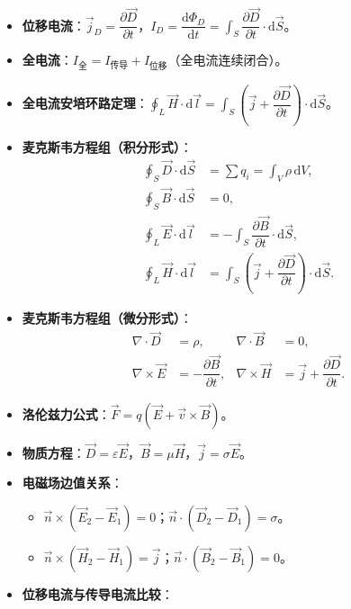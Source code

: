 \documentclass[12pt,a4paper]{ctexart}
\begin{document}
\begin{itemize}
    \item \textbf{位移电流}：$\vec j_D=\dfrac{\partial\vec D}{\partial t}$，$I_D=\dfrac{\mathrm d\Phi_D}{\mathrm dt}=\displaystyle\int_S\dfrac{\partial\vec D}{\partial t}\cdot\mathrm d\vec S$。
    \item \textbf{全电流}：$I_{\text{全}}=I_{\text{传导}}+I_{\text{位移}}$（全电流连续闭合）。
    \item \textbf{全电流安培环路定理}：$\displaystyle\oint_L\vec H\cdot\mathrm d\vec l=\displaystyle\int_S\left(\vec j+\dfrac{\partial\vec D}{\partial t}\right)\cdot\mathrm d\vec S$。
    \item \textbf{麦克斯韦方程组（积分形式）}：
    \begin{align}
        \oint_S\vec D\cdot\mathrm d\vec S &= \sum q_i=\int_V\rho\,\mathrm dV, \\
        \oint_S\vec B\cdot\mathrm d\vec S &= 0, \\
        \oint_L\vec E\cdot\mathrm d\vec l &= -\int_S\dfrac{\partial\vec B}{\partial t}\cdot\mathrm d\vec S, \\
        \oint_L\vec H\cdot\mathrm d\vec l &= \int_S\left(\vec j+\dfrac{\partial\vec D}{\partial t}\right)\cdot\mathrm d\vec S.
    \end{align}
    \item \textbf{麦克斯韦方程组（微分形式）}：
    \begin{align}
        \nabla\cdot\vec D &= \rho, & \nabla\cdot\vec B &= 0, \\
        \nabla\times\vec E &= -\dfrac{\partial\vec B}{\partial t}, & \nabla\times\vec H &= \vec j+\dfrac{\partial\vec D}{\partial t}.
    \end{align}
    \item \textbf{洛伦兹力公式}：$\vec F=q(\vec E+\vec v\times\vec B)$。
    \item \textbf{物质方程}：$\vec D=\varepsilon\vec E$，$\vec B=\mu\vec H$，$\vec j=\sigma\vec E$。
    \item \textbf{电磁场边值关系}：
    \begin{itemize}
        \item $\vec n\times(\vec E_2-\vec E_1)=0$；$\vec n\cdot(\vec D_2-\vec D_1)=\sigma$。
        \item $\vec n\times(\vec H_2-\vec H_1)=\vec j$；$\vec n\cdot(\vec B_2-\vec B_1)=0$。
    \end{itemize}
    \item \textbf{位移电流与传导电流比较}：
    \begin{itemize}

\end{itemize}
\end{itemize}
\end{document}
